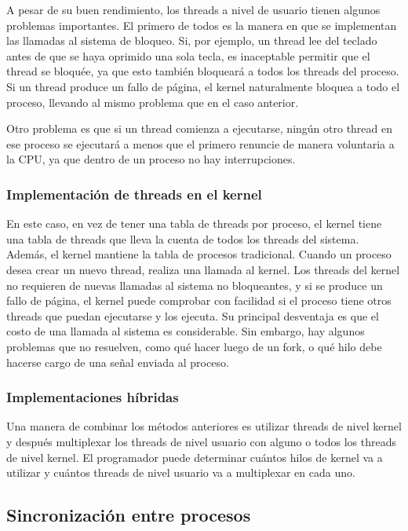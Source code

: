 A pesar de su buen rendimiento, los threads a nivel de usuario tienen algunos problemas importantes. El primero de todos es la manera en que se implementan las llamadas al sistema de bloqueo. Si, por ejemplo, un thread lee del teclado antes de que se haya oprimido una sola tecla, es inaceptable permitir que el thread se bloquée, ya que esto también bloqueará a todos los threads del proceso. Si un thread produce un fallo de página, el kernel naturalmente bloquea a todo el proceso, llevando al mismo problema que en el caso anterior.

Otro problema es que si un thread comienza a ejecutarse, ningún otro thread en ese proceso se ejecutará a menos que el primero renuncie de manera voluntaria a la CPU, ya que dentro de un proceso no hay interrupciones.

\subsubsection{Implementación de threads en el kernel}

En este caso, en vez de tener una tabla de threads por proceso, el kernel tiene una tabla de threads que lleva la cuenta de todos los threads del sistema. Además, el kernel mantiene la tabla de procesos tradicional. Cuando un proceso desea crear un nuevo thread, realiza una llamada al kernel. Los threads del kernel no requieren de nuevas llamadas al sistema no bloqueantes, y si se produce un fallo de página, el kernel puede comprobar con facilidad si el proceso tiene otros threads que puedan ejecutarse y los ejecuta. Su principal desventaja es que el costo de una llamada al sistema es considerable. Sin embargo, hay algunos problemas que no resuelven, como qué hacer luego de un fork, o qué hilo debe hacerse cargo de una señal enviada al proceso.

\subsubsection{Implementaciones híbridas}

Una manera de combinar los métodos anteriores es utilizar threads de nivel kernel y después multiplexar los threads de nivel usuario con alguno o todos los threads de nivel kernel. El programador puede determinar cuántos hilos de kernel va a utilizar y cuántos threads de nivel usuario va a multiplexar en cada uno.


\subsection{Sincronización entre procesos}

